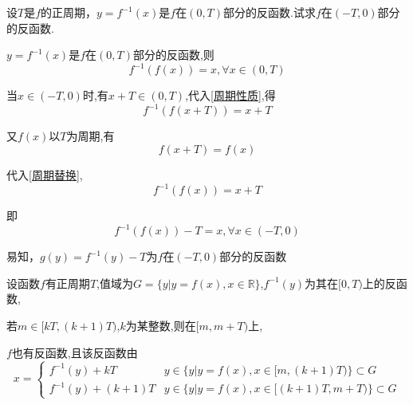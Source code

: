\begin{example}
    设$T$是$f$的正周期，$y=f^{-1}(x)$是$f$在$(0,T)$部分的反函数.试求$f$在$(-T,0)$部分的反函数.
\end{example}

\begin{solution}   \label{周期证明}

    $y=f^{-1}(x)$是$f$在$(0,T)$部分的反函数,则
    \begin{equation}
        f^{-1}(f(x))=x,\forall x \in (0,T) \label{周期性质}
    \end{equation}

    当$x \in (-T,0)$时,有$x+T\in (0,T)$,代入\ref{周期性质},得
    \begin{equation}
        f^{-1}(f(x+T))=x+T  \label{周期替换}
    \end{equation}

    又$f(x)$以$T$为周期,有
    \begin{equation}
        f(x+T)=f(x)
    \end{equation}

    代入\ref{周期替换},
    \begin{equation*}
        f^{-1}(f(x))=x+T
    \end{equation*}

    即
    \begin{equation*}
        f^{-1}(f(x))-T=x,\forall x \in (-T,0)
    \end{equation*}

    易知，$g(y)=f^{-1}(y)-T$为$f$在$(-T,0)$部分的反函数

\end{solution}

\begin{theorem}[反函数周期偏移]
    设函数$f$有正周期$T$,值域为$G=\{y|y=f(x),x \in \mathbb{R}\}$,$f^{-1}(y)$为其在$[0,T)$上的反函数,

    若$m\in [kT,(k+1)T)$,$k$为某整数,则在$[m,m+T)$上,

    $f$也有反函数,且该反函数由
    \begin{equation}
        x = \begin{cases}
            f^{-1}(y)+kT     & y\in \{y|y=f(x),x\in [m,(k+1)T)\}\subset G   \\
            f^{-1}(y)+(k+1)T & y\in \{y|y=f(x),x\in [(k+1)T,m+T)\}\subset G
        \end{cases}
    \end{equation}
\end{theorem}

